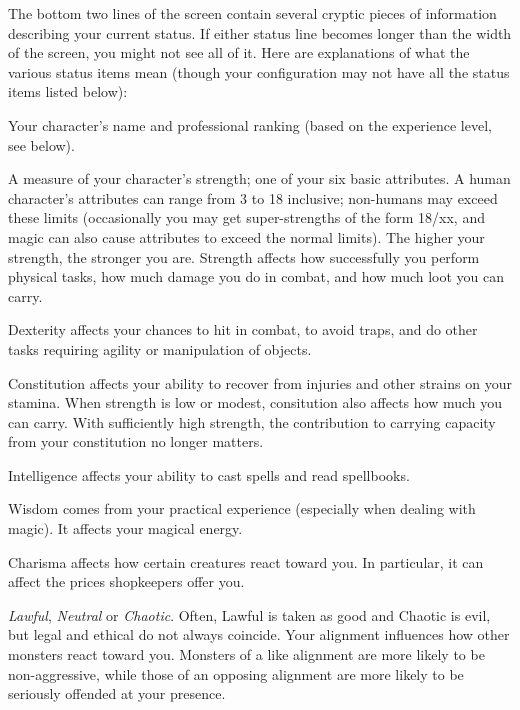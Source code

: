 The bottom two lines of the screen contain several cryptic pieces of
information describing your current status.  If either status line
becomes longer than the width of the screen, you might not see all of
it.  Here are explanations of what the various status items mean
(though your configuration may not have all the status items listed
below):

\blist{}
\item[\bb{Rank}]
Your character's name and professional ranking (based on the
experience level, see below).
\item[\bb{Strength}]
A measure of your character's strength; one of your six basic
attributes.  A human character's attributes can range from 3 to 18 inclusive;
non-humans may exceed these limits
(occasionally you may get super-strengths of the form 18/xx, and magic can
also cause attributes to exceed the normal limits).  The
higher your strength, the stronger you are.  Strength affects how
successfully you perform physical tasks, how much damage you do in
combat, and how much loot you can carry.
\item[\bb{Dexterity}]
Dexterity affects your chances to hit in combat, to avoid traps, and
do other tasks requiring agility or manipulation of objects.
\item[\bb{Constitution}]
Constitution affects your ability to recover from injuries and other
strains on your stamina.
When strength is low or modest, consitution also affects how much you
can carry.  With sufficiently high strength, the contribution to
carrying capacity from your constitution no longer matters.
\item[\bb{Intelligence}]
Intelligence affects your ability to cast spells and read spellbooks.
\item[\bb{Wisdom}]
Wisdom comes from your practical experience (especially when dealing with
magic).  It affects your magical energy.
\item[\bb{Charisma}]
Charisma affects how certain creatures react toward you.  In
particular, it can affect the prices shopkeepers offer you.
\item[\bb{Alignment}]
%
{\it Lawful}, {\it Neutral\/} or {\it Chaotic}.  Often, Lawful is
taken as good and Chaotic is evil, but legal and ethical do not always
coincide.  Your alignment influences how other
monsters react toward you.  Monsters of a like alignment are more likely
to be non-aggressive, while those of an opposing alignment are more likely
to be seriously offended at your presence.
